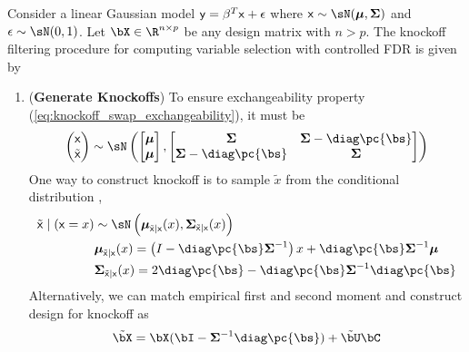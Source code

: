 \documentclass[11pt]{article}
\begin{document}
Consider a linear Gaussian model $\mathsf{y} = \beta^T\mathsf{x} + \epsilon$ where $\rx\sim\sN(\bmu,\bSigma)$ and $\epsilon\sim\sN(0,1)$. Let $\bX \in\R^{n\times p}$ be any design matrix with $n>p$. The knockoff filtering procedure for computing variable selection with controlled FDR is given by
\begin{enumerate}
    \item (\textbf{Generate Knockoffs}) 
    To ensure exchangeability property (\ref{eq:knockoff_swap_exchangeability}), it must be
    \begin{align*}
        \begin{pmatrix}
            \rx \\
            \tilde{\rx}
        \end{pmatrix}            
            \sim \sN\left(
                \begin{bmatrix}
                    \bmu \\ 
                    \bmu \\
                \end{bmatrix}, 
                \begin{bmatrix}
                    \bSigma & \bSigma - \diag\pc{\bs} \\
                    \bSigma - \diag\pc{\bs} & \bSigma \\
                \end{bmatrix}\right)
    \end{align*}
    One way to construct knockoff is to sample $\tilde{x}$ from the conditional distribution \cite{candesPanningGoldModelX2017,gimenezKnockoffsMassNew2019},
    \begin{align*}
        \tilde{\rx} \mid (\rx = x)
            &\sim \sN\left(
                \bmu_{\tilde{\rx}|\rx}(x), \bSigma_{\tilde{\rx}|\rx}(x)
            \right) \\
        &\bmu_{\tilde{\rx}|\rx}(x) 
            = \left (I - \diag\pc{\bs}\bSigma^{-1}\right) x + \diag\pc{\bs}\bSigma^{-1} \bmu\\
        &\bSigma_{\tilde{\rx}|\rx}(x)
            = 2\diag\pc{\bs} - \diag\pc{\bs}\bSigma^{-1}\diag\pc{\bs}
    \end{align*}
    Alternatively, we can match empirical first and second moment \cite{barberControllingFalseDiscovery2015} and construct design for knockoff as 
    \begin{align*}
        \tilde{\bX}
            = \bX(\bI - \bSigma^{-1}\diag\pc{\bs}) + \tilde{\bU}\bC
    \end{align*}

\end{enumerate}
\end{document}
